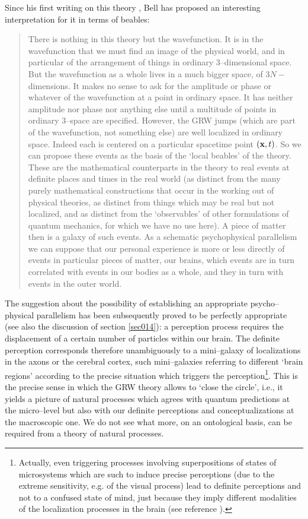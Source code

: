 \documentclass[12pt]{article}
\begin{document}
Since his first writing on this theory \cite{bells}, Bell has
proposed an interesting interpretation for it in terms of beables:
\begin{quotation}
There is nothing in this theory but the wavefunction. It is in the
wavefunction that we must find an image of the physical world, and
in particular of the arrangement of things in ordinary
3--dimensional space. But the wavefunction as a whole lives in a
much bigger space, of $3N-$dimensions. It makes no sense to ask
for the amplitude or phase or whatever of the wavefunction at a
point in ordinary space. It has neither amplitude nor phase nor
anything else until a multitude of points in ordinary 3--space are
specified. However, the GRW jumps (which are part of the
wavefunction, not something else) are well localized in ordinary
space. Indeed each is centered on a particular spacetime point
$({\bf x},t)$. So we can propose these events as the basis of the
`local beables' of the theory. These are the mathematical
counterparts in the theory to real events at definite places and
times in the real world (as distinct from the many purely
mathematical constructions that occur in the working out of
physical theories, as distinct from things which may be real but
not localized, and as distinct from the `observables' of other
formulations of quantum mechanics, for which we have no use here).
A piece of matter then is a galaxy of such events. As a schematic
psychophysical parallelism we can suppose that our personal
experience is more or less directly of events in particular pieces
of matter, our brains, which events are in turn correlated with
events in our bodies as a whole, and they in turn with events in
the outer world.
\end{quotation}

The suggestion about the possibility of establishing
an appropriate psycho--physical parallelism has been subsequently
proved  \cite{abp}  to be perfectly appropriate (see also the discussion of
section
\ref{sec014}): a perception process
requires the displacement of a certain number of particles within
our brain. The definite perception corresponds therefore
unambiguously to a mini--galaxy of localizations in the axons or
the cerebral cortex, such mini--galaxies referring to different
`brain regions' according to the precise situation which triggers the
perception\footnote{Actually, even triggering processes involving
superpositions of states of microsystems which are such to induce
precise perceptions (due to the extreme sensitivity, e.g. of the
visual process) lead to definite perceptions and not to a confused
state of mind, just because they imply different modalities of the
localization processes in the brain (see reference \cite{abp}).}.
This is the precise sense in which the GRW theory allows  to
`close the circle', i.e., it yields a picture of natural processes
which agrees with quantum predictions at the micro--level but also
with our definite perceptions and conceptualizations at the
macroscopic one. We do not see what more, on an ontological basis,
can be required from a theory of natural processes.
\end{document}
